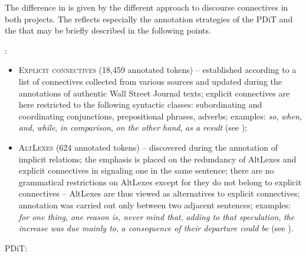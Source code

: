 \documentclass[output=paper]{langsci/langscibook.cls}
\begin{document}
\newpage
The difference in  is given by the different approach to discourse connectives in both projects. The  reflects especially the annotation strategies of the PDiT and the  that may be briefly described in the following points.

\vspace{\baselineskip}
\noindent {}:

\begin{itemize}

\item \textsc{Explicit connectives} (18,459 annotated tokens) – established according to a list of connectives collected from various sources \citep[cf. e.g.][]{halliday2014cohesion,martin1992english} and updated during the annotations of authentic Wall Street Journal texts; explicit connectives are here restricted to the following syntactic classes: subordinating and coordinating conjunctions, prepositional phrases, adverbs; examples: \textit{so}, \textit{when}, \textit{and}, \textit{while}, \textit{in comparison}, \textit{on the other hand}, \textit{as a result} (see \citealt{prasad2010realization});


\item \textsc{AltLexes} (624 annotated tokens) – discovered during the annotation of implicit relations; the emphasis is placed on the redundancy of AltLexes and explicit connectives in signaling one  in the same sentence; there are no grammatical restrictions on AltLexes except for they do not belong to explicit connectives – AltLexes are thus viewed as alternatives to explicit connectives; annotation was carried out only between two adjacent sentences; examples: \textit{for one thing}, \textit{one reason is, never mind that}, \textit{adding to that speculation}, \textit{the increase was due mainly to}, \textit{a consequence of their departure could be} (see \citealt{prasad2010realization}).

\end{itemize}

\vspace{\baselineskip}
\noindent PDiT:
\end{document}
